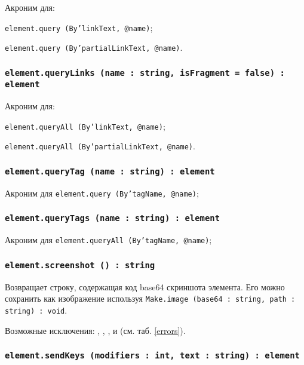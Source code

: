 Акроним для:
\begin{icItems}
	\item \texttt{element.query (By'linkText, @name)};
	\item \texttt{element.query (By'partialLinkText, @name)}.
\end{icItems}

\subsubsection{\texttt{element.queryLinks (name : string, isFragment = false) : element}}

Акроним для:
\begin{icItems}
	\item \texttt{element.queryAll (By'linkText, @name)};
	\item \texttt{element.queryAll (By'partialLinkText, @name)}.
\end{icItems}

\subsubsection{\texttt{element.queryTag (name : string) : element}}

Акроним для \texttt{element.query (By'tagName, @name)};

\subsubsection{\texttt{element.queryTags (name : string) : element}}

Акроним для \texttt{element.queryAll (By'tagName, @name)};

\subsubsection{\texttt{element.screenshot () : string}}

Возвращает строку, содержащая код base64 скриншота элемента. Его можно сохранить как изображение используя \texttt{Make.image (base64 : string, path : string) : void}.

Возможные исключения: , , ,  и  (см. таб. \ref{errors}).

\subsubsection{\texttt{element.sendKeys (modifiers : int, text : string) : element}}

